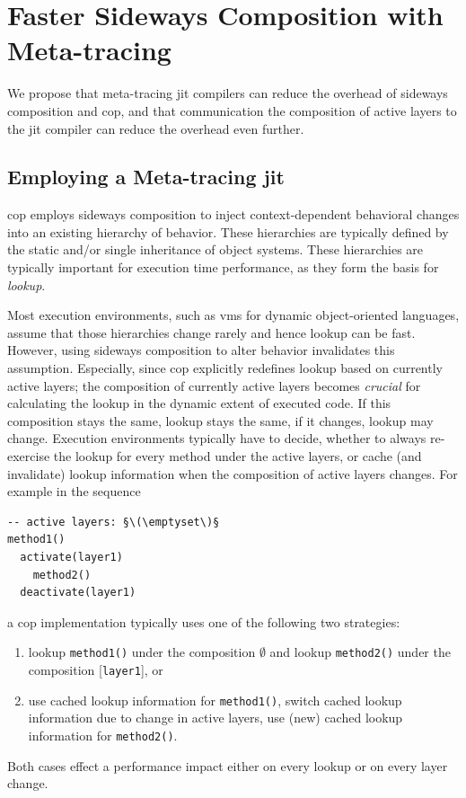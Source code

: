 \documentclass[preprint,english,10pt,nonatbib]{sigplanconf}
\begin{document}
\section{Faster Sideways Composition with Meta-tracing}

We propose that meta-tracing \ac{jit} compilers can reduce the overhead of
sideways composition and \ac{cop}, and that communication the composition of
active layers to the \ac{jit} compiler can reduce the overhead even further.

\subsection{Employing a Meta-tracing \protect\acs{jit}}
\Acl{cop} employs sideways composition to inject context-dependent behavioral
changes into an existing hierarchy of behavior. These hierarchies are typically
defined by the static and/or single inheritance of object systems. These
hierarchies are typically important for execution time performance, as they
form the basis for \emph{lookup}.

Most execution environments, such as \acp{vm} for dynamic object-oriented
languages, assume that those hierarchies change rarely and hence lookup can be
fast. However, using sideways composition to alter behavior invalidates this
assumption. Especially, since \ac{cop} explicitly redefines lookup based on
currently active layers; the composition of currently active layers becomes
\emph{crucial} for calculating the lookup in the dynamic extent of executed
code. If this composition stays the same, lookup stays the same, if it changes,
lookup may change. Execution environments typically have to decide, whether to
always re-exercise the lookup for every method under the active layers, or
cache (and invalidate) lookup information when the composition of active layers
changes. For example in the sequence
\begin{lstlisting}
-- active layers: §\(\emptyset\)§
method1()
  activate(layer1)
    method2()
  deactivate(layer1)
\end{lstlisting}
a \ac{cop} implementation typically uses one of the following two strategies:
\begin{enumerate}
\item lookup \lstinline|method1()| under the composition
  \(\emptyset\)
  and lookup \lstinline|method2()| under the composition
  [\lstinline|layer1|], or
\item use cached lookup information for \lstinline|method1()|, switch cached
  lookup information due to change in active layers, use (new) cached lookup
  information for \lstinline|method2()|.
\end{enumerate}
Both cases effect a performance impact either on every lookup or on every
layer change.
\end{document}
